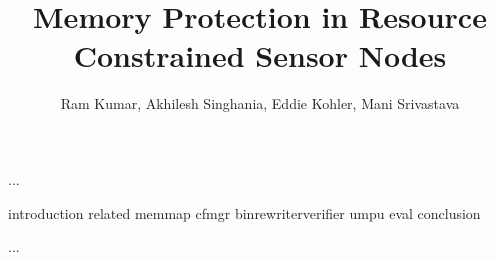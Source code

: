 \documentclass[acmtecs,acmnow,a4paper]{acmtrans2m}
\title{Memory Protection in Resource Constrained Sensor Nodes}
\author{Ram Kumar, Akhilesh Singhania, Eddie Kohler, Mani Srivastava}
\begin{document}
            
\begin{bottomstuff} 
...
\end{bottomstuff}
            
\maketitle


 {introduction}
 {related}
 {memmap}
 {cfmgr}
 {binrewriterverifier}
 {umpu}
 {eval}
 {conclusion}






\begin{received}
...
\end{received}
\end{document}
